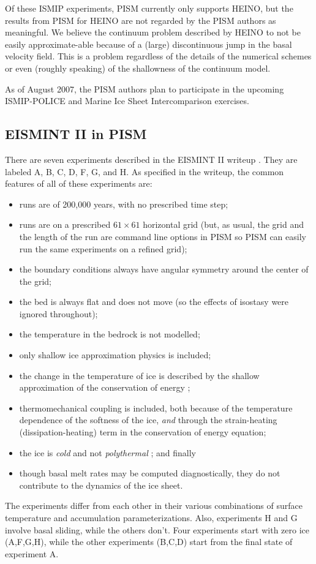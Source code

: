 \documentclass[11pt,final]{amsart}
\begin{document}
Of these ISMIP experiments, PISM currently only supports HEINO, but the results from PISM for HEINO are not regarded by the PISM authors as meaningful.  We believe the continuum problem described by HEINO to not be easily approximate-able because of a (large) discontinuous jump in the basal velocity field.  This is a problem regardless of the details of the numerical schemes or even (roughly speaking) of the shallowness of the continuum model.

As of August 2007, the PISM authors plan to participate in the upcoming ISMIP-POLICE and Marine Ice Sheet Intercomparison exercises.

\subsection{EISMINT II in PISM}  There are seven experiments described in the EISMINT II writeup \cite{EISMINT00}. They are labeled A, B, C, D, F, G, and H.  As specified in the writeup, the common features of all of these experiments are:\begin{itemize}
\item runs are of 200,000 years, with no prescribed time step;
\item runs are on a prescribed $61\times 61$ horizontal grid (but, as usual, the grid and the length of the run are command line options in PISM so PISM can easily run the same experiments on a refined grid);
\item the boundary conditions always have angular symmetry around the center of the grid;
\item the bed is always flat and does not move (so the effects of isostasy were ignored throughout);
\item the temperature in the bedrock is not modelled;
\item only shallow ice approximation physics is included;
\item the change in the temperature of ice is described by the shallow approximation of the conservation of energy \cite{Fowler};
\item thermomechanical coupling is included, both because of the temperature dependence of the softness of the ice, \emph{and} through the strain-heating (dissipation-heating) term in the conservation of energy equation;
\item the ice is \emph{cold} and not \emph{polythermal} \cite{Greve}; and finally
\item though basal melt rates may be computed diagnostically, they do not contribute to the dynamics of the ice sheet.
\end{itemize}
The experiments differ from each other in their various combinations of surface temperature and accumulation parameterizations.  Also, experiments H and G involve basal sliding, while the others don't.  Four experiments start with zero ice (A,F,G,H), while the other experiments (B,C,D) start from the final state of experiment A.
\end{document}

